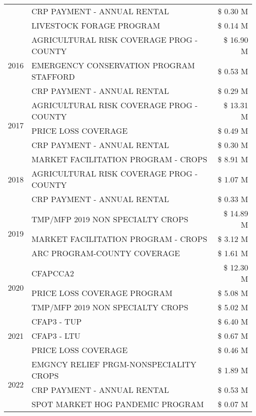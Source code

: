 \begin{tabular}{llr}
 & CRP PAYMENT - ANNUAL RENTAL & \$ 0.30 M \\
 & LIVESTOCK FORAGE PROGRAM & \$ 0.14 M \\
\cline{1-3}
\multirow[t]{3}{*}{2016} & AGRICULTURAL RISK COVERAGE PROG - COUNTY & \$ 16.90 M \\
 & EMERGENCY CONSERVATION PROGRAM STAFFORD & \$ 0.53 M \\
 & CRP PAYMENT - ANNUAL RENTAL & \$ 0.29 M \\
\cline{1-3}
\multirow[t]{3}{*}{2017} & AGRICULTURAL RISK COVERAGE PROG - COUNTY & \$ 13.31 M \\
 & PRICE LOSS COVERAGE & \$ 0.49 M \\
 & CRP PAYMENT - ANNUAL RENTAL & \$ 0.30 M \\
\cline{1-3}
\multirow[t]{3}{*}{2018} & MARKET FACILITATION PROGRAM - CROPS & \$ 8.91 M \\
 & AGRICULTURAL RISK COVERAGE PROG - COUNTY & \$ 1.07 M \\
 & CRP PAYMENT - ANNUAL RENTAL & \$ 0.33 M \\
\cline{1-3}
\multirow[t]{3}{*}{2019} & TMP/MFP 2019 NON SPECIALTY CROPS & \$ 14.89 M \\
 & MARKET FACILITATION PROGRAM - CROPS & \$ 3.12 M \\
 & ARC PROGRAM-COUNTY COVERAGE & \$ 1.61 M \\
\cline{1-3}
\multirow[t]{3}{*}{2020} & CFAPCCA2 & \$ 12.30 M \\
 & PRICE LOSS COVERAGE PROGRAM & \$ 5.08 M \\
 & TMP/MFP 2019 NON SPECIALTY CROPS & \$ 5.02 M \\
\cline{1-3}
\multirow[t]{3}{*}{2021} & CFAP3 - TUP & \$ 6.40 M \\
 & CFAP3 - LTU & \$ 0.67 M \\
 & PRICE LOSS COVERAGE & \$ 0.46 M \\
\cline{1-3}
\multirow[t]{3}{*}{2022} & EMGNCY RELIEF PRGM-NONSPECIALITY CROPS & \$ 1.89 M \\
 & CRP PAYMENT - ANNUAL RENTAL & \$ 0.53 M \\
 & SPOT MARKET HOG PANDEMIC PROGRAM & \$ 0.07 M \\
\cline{1-3}
\bottomrule
\end{tabular}
